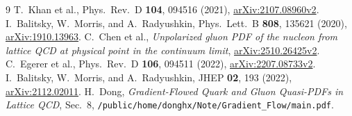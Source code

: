 \documentclass[11pt,a4paper]{article}
\begin{document}
\begin{thebibliography}{9}
T.~Khan et al., Phys.\ Rev.\ D \textbf{104}, 094516 (2021),
\href{https://arxiv.org/abs/2107.08960v2}{arXiv:2107.08960v2}.
I.~Balitsky, W.~Morris, and A.~Radyushkin, Phys.\ Lett.\ B \textbf{808},
135621 (2020), \href{https://arxiv.org/abs/1910.13963}{arXiv:1910.13963}.
C.~Chen et al., \emph{Unpolarized gluon PDF of the nucleon from lattice QCD
at physical point in the continuum limit},
\href{https://arxiv.org/abs/2510.26425v2}{arXiv:2510.26425v2}.
C.~Egerer et al., Phys.\ Rev.\ D \textbf{106}, 094511 (2022),
\href{https://arxiv.org/abs/2207.08733v2}{arXiv:2207.08733v2}.
I.~Balitsky, W.~Morris, and A.~Radyushkin, JHEP \textbf{02}, 193 (2022),
\href{https://arxiv.org/abs/2112.02011}{arXiv:2112.02011}.
H.~Dong, \emph{Gradient-Flowed Quark and Gluon Quasi-PDFs in Lattice QCD},
Sec.~8, \nolinkurl{/public/home/donghx/Note/Gradient_Flow/main.pdf}.
\end{thebibliography}
\end{document}
